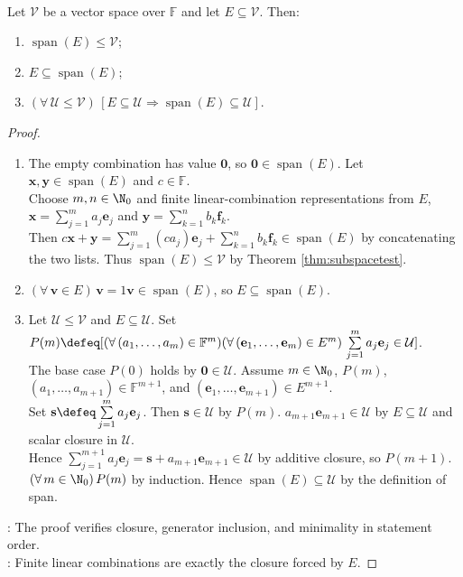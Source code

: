 \begin{theorem} \label{thm:span-smallest-containing-subspace} \\
Let $\mathcal{V}$ be a vector space over $\mathbb{F}$ and let $E\subseteq\mathcal{V}$. Then:
\begin{enumerate}[label=(\roman*)]
\setlength{\itemsep}{0pt}
\item $\operatorname{span}(E)\leq\mathcal{V}$;
\item $E\subseteq\operatorname{span}(E)$;
\item $(\forall\,\mathcal{U}\leq\mathcal{V})\,[E\subseteq\mathcal{U}\Rightarrow\operatorname{span}(E)\subseteq\mathcal{U}]$.
\end{enumerate}
\begin{proof}
\begin{enumerate}[label=(\roman*)]
\setlength{\itemsep}{0pt}
\item The empty combination has value $\mathbf{0}$, so $\mathbf{0}\in\operatorname{span}(E)$. Let $\mathbf{x},\mathbf{y}\in\operatorname{span}(E)$ and $c\in\mathbb{F}$.\\
Choose $m,n\in\N_0$ and finite linear-combination representations from $E$, $\mathbf{x}=\sum\limits_{j=1}^{m}a_j\mathbf{e}_j$ and $\mathbf{y}=\sum\limits_{k=1}^{n}b_k\mathbf{f}_k$.\\
Then $c\mathbf{x}+\mathbf{y}=\sum\limits_{j=1}^{m}(ca_j)\mathbf{e}_j+\sum\limits_{k=1}^{n}b_k\mathbf{f}_k\in\operatorname{span}(E)$ by concatenating the two lists. Thus $\operatorname{span}(E)\leq\mathcal{V}$ by Theorem \ref{thm:subspacetest}.
\item $(\forall\,\mathbf{v}\in E)\,\mathbf{v}=1\mathbf{v}\in\operatorname{span}(E)$, so $E\subseteq\operatorname{span}(E)$.
\item Let $\mathcal{U}\leq\mathcal{V}$ and $E\subseteq\mathcal{U}$. Set $P(m)\defeq[(\forall\,(a_1,\ldots,a_m)\in\mathbb{F}^m)(\forall\,(\mathbf{e}_1,\ldots,\mathbf{e}_m)\in E^m)\,\sum\limits_{j=1}^{m}a_j\mathbf{e}_j\in\mathcal{U}]$.\\
The base case $P(0)$ holds by $\mathbf{0}\in\mathcal{U}$. Assume $m\in\N_0$, $P(m)$, $(a_1,\ldots,a_{m+1})\in\mathbb{F}^{m+1}$, and $(\mathbf{e}_1,\ldots,\mathbf{e}_{m+1})\in E^{m+1}$.\\
Set $\mathbf{s}\defeq\sum\limits_{j=1}^{m}a_j\mathbf{e}_j$. Then $\mathbf{s}\in\mathcal{U}$ by $P(m)$. $a_{m+1}\mathbf{e}_{m+1}\in\mathcal{U}$ by $E\subseteq\mathcal{U}$ and scalar closure in $\mathcal{U}$.\\
Hence $\sum\limits_{j=1}^{m+1}a_j\mathbf{e}_j=\mathbf{s}+a_{m+1}\mathbf{e}_{m+1}\in\mathcal{U}$ by additive closure, so $P(m+1)$.\\
$(\forall\,m\in\N_0)\,P(m)$ by induction. Hence $\operatorname{span}(E)\subseteq\mathcal{U}$ by the definition of span.
\end{enumerate}
: The proof verifies closure, generator inclusion, and minimality in statement order.\\
: Finite linear combinations are exactly the closure forced by $E$.
\end{proof}
\end{theorem}

